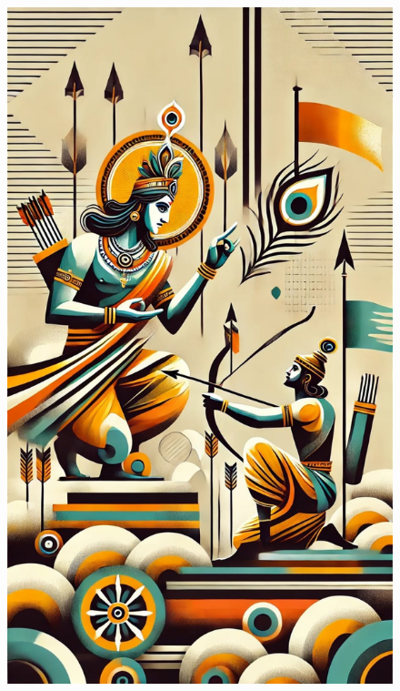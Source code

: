 \newpage
{} %
\thispagestyle{empty}
\begin{figure}
\centering
\includegraphics[width=\paperwidth, height=\paperheight]{./images/ArjunaVishada.jpg}
\end{figure}
\restoregeometry %

